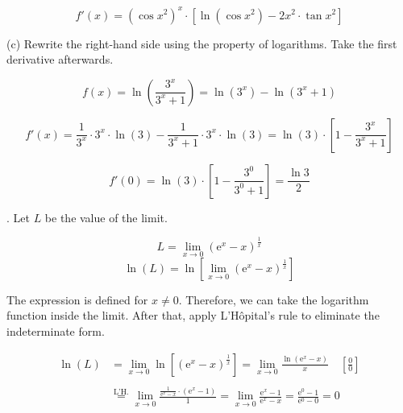 \documentclass{article}
\begin{document}
\begin{equation*}\boxed{f'(x)=\left(\cos x^2\right)^x\cdot\left[\ln\left(\cos x^2\right)-2x^2\cdot\tan x^2\right]}\end{equation*}

\hfill

\noindent (c) Rewrite the right-hand side using the property of logarithms. Take the first derivative afterwards.

\begin{equation*}f(x)=\ln\left(\frac{3^x}{3^x+1}\right)=\ln\left(3^x\right)-\ln\left(3^x+1\right)\end{equation*}

\begin{equation*}f'(x)=\frac1{3^x}\cdot 3^x\cdot \ln(3) -\frac1{3^x+1}\cdot3^x\cdot\ln(3)=\ln(3)\cdot\left[1-\frac{3^x}{3^x+1}\right]\end{equation*}

\begin{equation*}f'(0)=\ln(3)\cdot\left[1-\frac{3^0}{3^0+1}\right]=\boxed{\frac{\ln3}2}\end{equation*}

\hfill

. Let $L$ be the value of the limit.

\begin{equation*}L = \lim_{x\to0}\left(\mathrm{e}^x-x\right)^{\frac1x}\end{equation*}
\begin{equation*}\ln(L) = \ln\left[\lim_{x\to0}\left(\mathrm{e}^x-x\right)^{\frac1x}\right]\end{equation*}

\hfill

\noindent The expression is defined for $x\neq0$. Therefore, we can take the logarithm function inside the limit. After that, apply L'Hôpital's rule to eliminate the indeterminate form.

\begin{align*}\ln(L)&=\lim_{x\to0}\ln\left[\left(\mathrm{e}^x-x\right)^{\frac1x}\right]=\lim_{x\to0}\frac{\ln\left(\mathrm{e}^x-x\right)}x\quad\left[\frac00\right]\\\\&\overset{\text{L'H.}}{=}\lim_{x\to0}\frac{\displaystyle\frac{1}{\mathrm{e}^x-x}\cdot\left(\mathrm{e}^x-1\right)}{1}=\lim_{x\to0}\frac{\mathrm{e}^x-1}{\mathrm{e}^x-x}=\frac{\mathrm{e}^0-1}{\mathrm{e}^0-0}=0\end{align*}

\hfill
\end{document}
